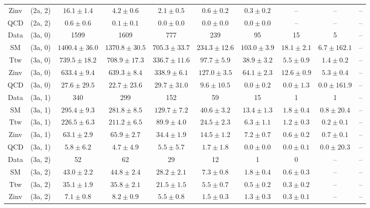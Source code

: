 \begin{table}[h!]
{\begin{tabular}{cccccccccc}
	Zinv & (2a, 2) & $16.1\pm 1.4$ & $4.2\pm 0.6$ & $2.1\pm 0.5$ & $0.6\pm 0.2$ & $0.3\pm 0.2$ & -- & -- & -- \\[0.5ex] 
	QCD & (2a, 2) & $0.6\pm 0.6$ & $0.1\pm 0.1$ & $0.0\pm 0.0$ & $0.0\pm 0.0$ & $0.0\pm 0.0$ & -- & -- & -- \\[0.5ex] 
	Data & (3a, 0) & 1599 & 1609 & 777 & 239 & 95 & 15 & 5 & -- \\[0.5ex] 
	SM & (3a, 0) & $1400.4\pm 36.0$ & $1370.8\pm 30.5$ & $705.3\pm 33.7$ & $234.3\pm 12.6$ & $103.0\pm 3.9$ & $18.1\pm 2.1$ & $6.7\pm 162.1$ & -- \\[0.5ex] 
	Ttw & (3a, 0) & $739.5\pm 18.2$ & $708.9\pm 17.3$ & $336.7\pm 11.6$ & $97.7\pm 5.9$ & $38.9\pm 3.2$ & $5.5\pm 0.9$ & $1.4\pm 0.2$ & -- \\[0.5ex] 
	Zinv & (3a, 0) & $633.4\pm 9.4$ & $639.3\pm 8.4$ & $338.9\pm 6.1$ & $127.0\pm 3.5$ & $64.1\pm 2.3$ & $12.6\pm 0.9$ & $5.3\pm 0.4$ & -- \\[0.5ex] 
	QCD & (3a, 0) & $27.6\pm 29.5$ & $22.7\pm 23.6$ & $29.7\pm 31.0$ & $9.6\pm 10.5$ & $0.0\pm 0.2$ & $0.0\pm 1.3$ & $0.0\pm 161.9$ & -- \\[0.5ex] 
	Data & (3a, 1) & 340 & 299 & 152 & 59 & 15 & 1 & 1 & -- \\[0.5ex] 
	SM & (3a, 1) & $295.4\pm 9.3$ & $281.8\pm 8.5$ & $129.7\pm 7.2$ & $40.6\pm 3.2$ & $13.4\pm 1.3$ & $1.8\pm 0.4$ & $0.8\pm 20.4$ & -- \\[0.5ex] 
	Ttw & (3a, 1) & $226.5\pm 6.3$ & $211.2\pm 6.5$ & $89.9\pm 4.0$ & $24.5\pm 2.3$ & $6.3\pm 1.1$ & $1.2\pm 0.3$ & $0.2\pm 0.1$ & -- \\[0.5ex] 
	Zinv & (3a, 1) & $63.1\pm 2.9$ & $65.9\pm 2.7$ & $34.4\pm 1.9$ & $14.5\pm 1.2$ & $7.2\pm 0.7$ & $0.6\pm 0.2$ & $0.7\pm 0.1$ & -- \\[0.5ex] 
	QCD & (3a, 1) & $5.8\pm 6.2$ & $4.7\pm 4.9$ & $5.5\pm 5.7$ & $1.7\pm 1.8$ & $0.0\pm 0.0$ & $0.0\pm 0.1$ & $0.0\pm 20.3$ & -- \\[0.5ex] 
	Data & (3a, 2) & 52 & 62 & 29 & 12 & 1 & 0 & -- & -- \\[0.5ex] 
	SM & (3a, 2) & $43.0\pm 2.2$ & $44.8\pm 2.4$ & $28.2\pm 2.1$ & $7.3\pm 0.8$ & $1.8\pm 0.4$ & $0.6\pm 0.3$ & -- & -- \\[0.5ex] 
	Ttw & (3a, 2) & $35.1\pm 1.9$ & $35.8\pm 2.1$ & $21.5\pm 1.5$ & $5.5\pm 0.7$ & $0.5\pm 0.2$ & $0.3\pm 0.2$ & -- & -- \\[0.5ex] 
	Zinv & (3a, 2) & $7.1\pm 0.8$ & $8.2\pm 0.9$ & $5.5\pm 0.8$ & $1.5\pm 0.3$ & $1.3\pm 0.3$ & $0.3\pm 0.1$ & -- & -- \\[0.5ex] 

\end{tabular}}
\end{table}
